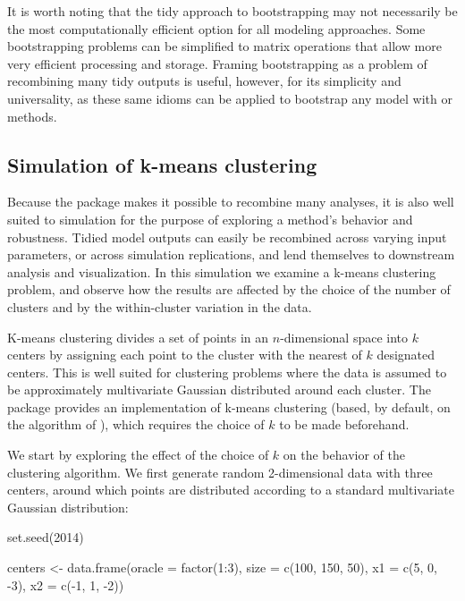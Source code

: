 It is worth noting that the tidy approach to bootstrapping may not necessarily be the most computationally efficient option for all modeling approaches. Some bootstrapping problems can be simplified to matrix operations that allow more very efficient processing and storage. Framing bootstrapping as a problem of recombining many tidy outputs is useful, however, for its simplicity and universality, as these same idioms can be applied to bootstrap any model with  or  methods.

\subsection{Simulation of k-means clustering}

\label{sec:kmeans}

Because the  package makes it possible to recombine many analyses, it is also well suited to simulation for the purpose of exploring a method's behavior and robustness. Tidied model outputs can easily be recombined across varying input parameters, or across simulation replications, and lend themselves to downstream analysis and visualization. In this simulation we examine a k-means clustering problem, and observe how the results are affected by the choice of the number of clusters and by the within-cluster variation in the data.

K-means clustering divides a set of points in an $n$-dimensional space into $k$ centers by assigning each point to the cluster with the nearest of $k$ designated centers. This is well suited for clustering problems where the data is assumed to be approximately multivariate Gaussian distributed around each cluster. The  package provides an implementation of k-means clustering (based, by default, on the algorithm of \citet{HartiganWong:1979}), which requires the choice of $k$ to be made beforehand.

We start by exploring the effect of the choice of $k$ on the behavior of the clustering algorithm. We first generate random 2-dimensional data with three centers, around which points are distributed according to a standard multivariate Gaussian distribution:


\begin{example}
set.seed(2014)
\end{example}

\begin{example}
centers <- data.frame(oracle = factor(1:3),
                      size = c(100, 150, 50),
                      x1 = c(5, 0, -3),
                      x2 = c(-1, 1, -2))
\end{example}

